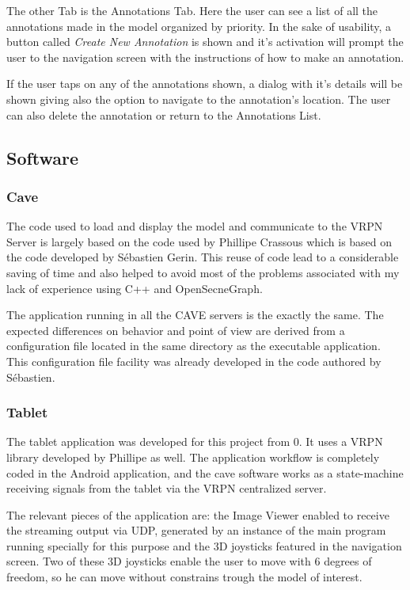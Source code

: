 The other Tab is the Annotations Tab. Here the user can see a list of all the annotations made in the model organized by priority. In the sake of usability, a button called \emph{Create New Annotation} is shown and it's activation will prompt the user to the navigation screen with the instructions of how to make an annotation.

If the user taps on any of the annotations shown, a dialog with it's details will be shown giving also the option to navigate to the annotation's location. The user can also delete the annotation or return to the Annotations List.
\subsection{Software}
\subsubsection{Cave}
The code used to load and display the model and communicate to the VRPN Server is largely based on the code used by Phillipe Crassous which is based on the code developed by Sébastien Gerin. This reuse of code lead to a considerable saving of time and also helped to avoid most of the problems associated with my lack of experience using C++ and OpenSecneGraph.

The application running in all the CAVE servers is the exactly the same. The expected differences on behavior and point of view are derived from a configuration file located in the same directory as the executable application. This configuration file facility was already developed in the code authored by Sébastien.

\subsubsection{Tablet}

The tablet application was developed for this project from 0. It uses a VRPN library developed by Phillipe as well. The application workflow is completely coded in the Android application, and the cave software works as a state-machine receiving signals from the tablet via the VRPN centralized server. 

The relevant pieces of the application are: the Image Viewer enabled to receive the streaming output via UDP, generated by an instance of the main program running specially for this purpose and the 3D joysticks featured in the navigation screen. Two of these 3D joysticks enable the user to move with 6 degrees of freedom, so he can move without constrains trough the model of interest.

